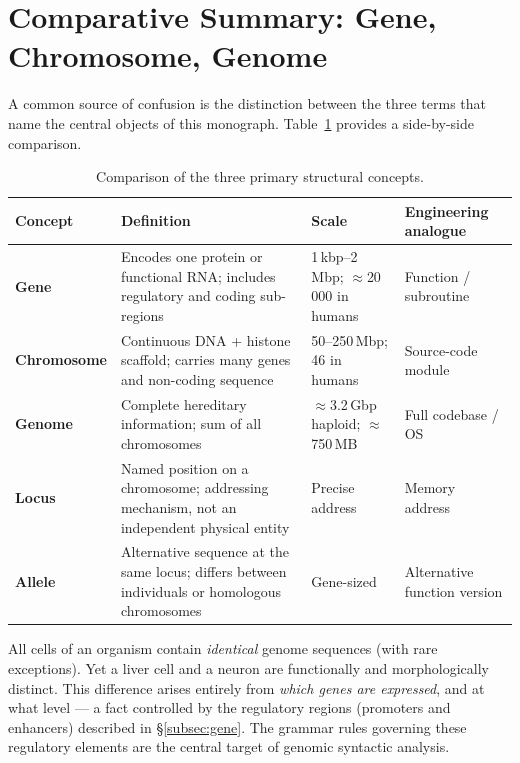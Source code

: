 \documentclass[12pt, a4paper, oneside]{book}
\theoremstyle{definition}
\theoremstyle{remark}
\begin{document}
\section{Comparative Summary: Gene, Chromosome, Genome}
\label{sec:comparison}

A common source of confusion is the distinction between the three terms
that name the central objects of this monograph.
Table~\ref{tab:compare} provides a side-by-side comparison.

\begin{table}[htbp]
\centering
\caption{Comparison of the three primary structural concepts.}
\label{tab:compare}
\renewcommand{\arraystretch}{1.4}
{\small
\begin{tabularx}{\textwidth}{>{\bfseries}l X X X}
\toprule
Concept & Definition & Scale & Engineering analogue \\
\midrule
\textcolor{c4}{Gene}
  & Encodes one protein or functional RNA; includes
    regulatory and coding sub-regions
  & 1\,kbp--2\,Mbp; $\approx$20\,000 in humans
  & Function / subroutine \\
\textcolor{c5}{Chromosome}
  & Continuous DNA + histone scaffold; carries many genes
    and non-coding sequence
  & 50--250\,Mbp; 46 in humans
  & Source-code module \\
\textcolor{c6}{Genome}
  & Complete hereditary information; sum of all chromosomes
  & $\approx$3.2\,Gbp haploid; $\approx$750\,MB
  & Full codebase / OS \\
\midrule
\textcolor{c2}{Locus}
  & Named position on a chromosome; addressing mechanism,
    not an independent physical entity
  & Precise address
  & Memory address \\
\textcolor{c1}{Allele}
  & Alternative sequence at the same locus; differs between
    individuals or homologous chromosomes
  & Gene-sized
  & Alternative function version \\
\bottomrule
\end{tabularx}
}
\end{table}

\begin{keybox}
All cells of an organism contain \emph{identical} genome sequences
(with rare exceptions).  Yet a liver cell and a neuron are functionally
and morphologically distinct.  This difference arises entirely from
\emph{which genes are expressed}, and at what level --- a fact controlled
by the regulatory regions (promoters and enhancers) described in
\S\ref{subsec:gene}.  The grammar rules governing these regulatory
elements are the central target of genomic syntactic analysis.
\end{keybox}
\end{document}
